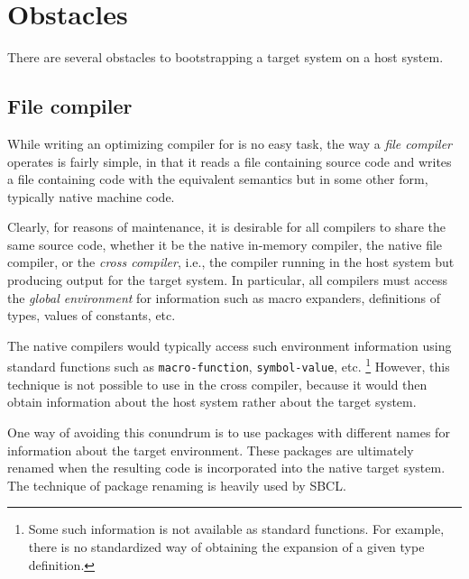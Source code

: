 \section{Obstacles}

There are several obstacles to bootstrapping a target \commonlisp{}
system on a host \commonlisp{} system.

\subsection{File compiler}

While writing an optimizing compiler for \commonlisp{} is no easy
task, the way a \emph{file compiler} operates is fairly simple, in
that it reads a file containing source code and writes a file
containing code with the equivalent semantics but in some other form,
typically native machine code.

Clearly, for reasons of maintenance, it is desirable for all compilers
to share the same source code, whether it be the native in-memory
compiler, the native file compiler, or the \emph{cross compiler},
i.e., the compiler running in the host \commonlisp{} system but
producing output for the target system.  In particular, all compilers
must access the \emph{global environment} for information such as
macro expanders, definitions of types, values of constants, etc.

The native compilers would typically access such environment
information using standard functions such as \texttt{macro-function},
\texttt{symbol-value}, etc.%
\footnote{Some such information is not available as standard
  functions.  For example, there is no standardized way of obtaining
  the expansion of a given type definition.}
However, this technique is not possible to use in the cross compiler,
because it would then obtain information about the host \commonlisp{}
system rather about the target \commonlisp{} system.

One way of avoiding this conundrum is to use packages with different
names for information about the target environment.  These packages
are ultimately renamed when the resulting code is incorporated into
the native target system.  The technique of package renaming is
heavily used by SBCL.
